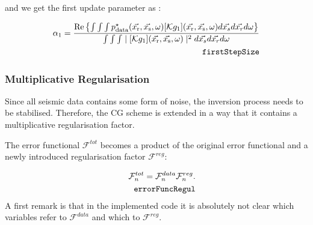 \documentclass[10pt,a4paper]{article}
\newcommand{\real}[1]{\text{Re} \left\{ #1 \right\}}
\begin{document}
and we get the first update parameter as :

\begin{align} \label{eq:firstStepSize} \alpha_1 = \frac {\real {\int \int
\int p^{\star}_\text{data}(\vec{x_\text{r}},\vec{x_\text{s}},\omega)[\mathcal{K}
g_1](\vec{x_\text{r}},\vec{x_\text{s}},\omega)d\vec{x_s}d\vec{x_r}d\omega}}{\int
\int \int \mid[\mathcal{K}
g_1](\vec{x_\text{r}},\vec{x_\text{s}},\omega) \mid^2
d\vec{x_s}d\vec{x_r}d\omega}\\
\tag*{\texttt{firstStepSize}}
\end{align}


\subsubsection{Multiplicative Regularisation}
\label{multreg}
Since all seismic data contains some form of noise, the inversion
process needs to be stabilised. Therefore, the CG scheme is extended
in a way that it contains a multiplicative regularisation factor.

The error functional $\mathcal{F}^{tot}$ becomes a product of the
original error functional and a newly introduced regularisation factor
$\mathcal{F}^{reg}$:


\begin{align} \label{eq:errorFuncRegul} \mathcal{F}^{tot}_n =
\mathcal{F}^{data}_n \mathcal{F}^{reg}_n.\\
\tag*{\texttt{errorFuncRegul}}
\end{align}
A first remark is that in the implemented code it is absolutely not clear which variables refer to $\mathcal{F}^{data}$ and which to $\mathcal{F}^{reg}$.
\end{document}
